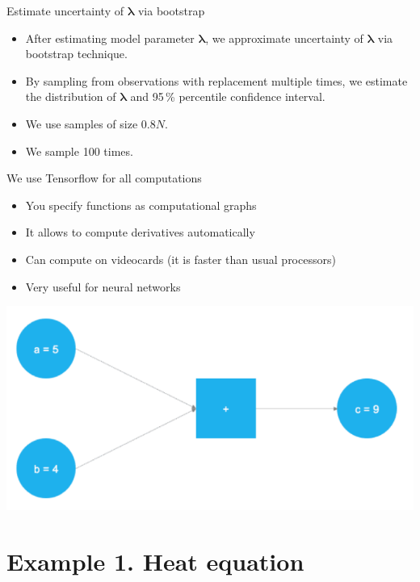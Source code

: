 \documentclass{beamer}
\renewcommand{\vec}[1]{\boldsymbol{#1}}
\newcommand{\VLambda}{\ensuremath{\vec{\lambda}}}
\begin{document}
\begin{frame}{Estimate uncertainty of $\VLambda$ via bootstrap}
\begin{itemize}
    \setlength\itemsep{1em}
    \item After estimating model parameter $\VLambda$, we approximate uncertainty of
$\vec{\lambda}$ via bootstrap technique.
    \item By sampling from observations with replacement multiple times, we estimate
the distribution of $\VLambda$ and 95\,\% percentile confidence interval.
    \item We use samples of size $0.8N$.
    \item We sample 100 times.
\end{itemize}
\end{frame}

\begin{frame}{We use Tensorflow for all computations}
\begin{itemize}
    \item You specify functions as computational graphs
    \item It allows to compute derivatives automatically
    \item Can compute on videocards (it is faster than usual
          processors)
    \item Very useful for neural networks
\end{itemize}
    
\centering
\includegraphics[scale = 0.2]{images/graph-example.png}
\end{frame}





\section{Example 1. Heat equation}
\end{document}
